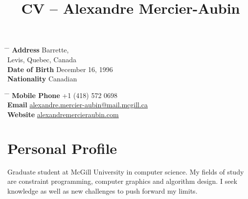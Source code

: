 \documentclass[10pt]{article} %
\begin{document}

\title{CV -- Alexandre Mercier-Aubin} %


\parbox{0.5\textwidth}{ %
\begin{tabbing} %
\hspace{3cm} \= \hspace{4cm} \= \kill %
{\bf Address}  Barrette,\\ %
\> Levis, Quebec, Canada \\ %
{\bf Date of Birth} \> December 16, 1996 \\ %
{\bf Nationality} \> Canadian %
\end{tabbing}}
\hfill %
\parbox{0.5\textwidth}{ %
\begin{tabbing} %
\hspace{3cm} \= \hspace{4cm} \= \kill %
{\bf Mobile Phone} \> +1 (418) 572 0698 \\ %
{\bf Email} \> \href{mailto:alexandre.mercier-aubin@mail.mcgill.ca}{alexandre.mercier-aubin@mail.mcgill.ca} \\ %
{\bf Website} \> \href{alexandremercieraubin.github.io}{alexandremercieraubin.com} \\
\end{tabbing}}


\section{Personal Profile}

Graduate student at McGill University in computer science. My fields of study are constraint programming, computer graphics and algorithm design. I seek knowledge as well as new challenges to push forward my limits.

\end{document}

